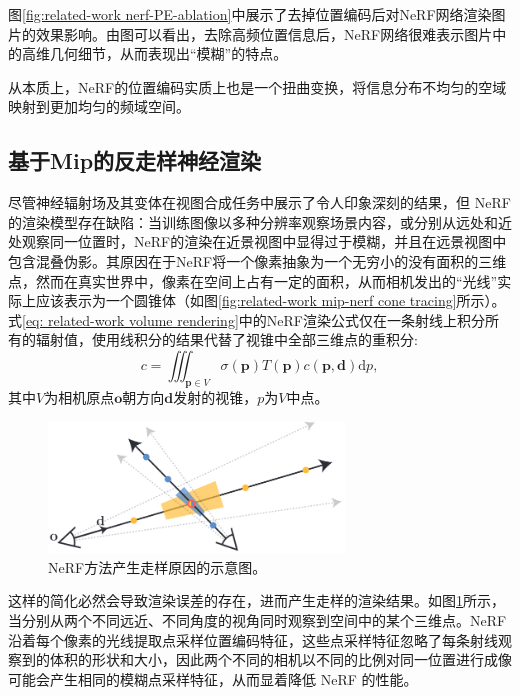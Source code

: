 图\ref{fig:related-work nerf-PE-ablation}中展示了去掉位置编码后对NeRF网络渲染图片的效果影响。由图可以看出，去除高频位置信息后，NeRF网络很难表示图片中的高维几何细节，从而表现出“模糊”的特点。

从本质上，NeRF的位置编码实质上也是一个扭曲变换，将信息分布不均匀的空域映射到更加均匀的频域空间。

\subsection{基于Mip的反走样神经渲染}
尽管神经辐射场\cite{mildenhall_nerf_2020}及其变体\cite{muller_instant_2022,martin-brualla_nerf_2021,zhang_nerf_2020}在视图合成任务中展示了令人印象深刻的结果，但 NeRF 的渲染模型存在缺陷：当训练图像以多种分辨率观察场景内容，或分别从远处和近处观察同一位置时，NeRF的渲染在近景视图中显得过于模糊，并且在远景视图中包含混叠伪影。其原因在于NeRF将一个像素抽象为一个无穷小的没有面积的三维点，然而在真实世界中，像素在空间上占有一定的面积，从而相机发出的“光线”实际上应该表示为一个圆锥体（如图\ref{fig:related-work mip-nerf cone tracing}所示）。式\ref{eq: related-work volume rendering}中的NeRF渲染公式仅在一条射线上积分所有的辐射值，使用线积分的结果代替了视锥中全部三维点的重积分:
\begin{equation}
    c = \iiint_{\mathbf{p}\in V}\sigma(\mathbf{p})T(\mathbf{p})c(\mathbf{p},\mathbf{d})\text{d}p,
\end{equation}
其中$V$为相机原点$\mathbf{o}$朝方向$\mathbf{d}$发射的视锥，$p$为$V$中点。

\begin{figure}[ht]
    \centering
    \includegraphics[width=0.7\textwidth]{undergraduate-thesis/images/related-work/mipnerf-intersection.png}
    \caption{NeRF方法产生走样原因的示意图\cite{barron_mip-nerf_2021}。}
    \label{fig:related-work mip-nerf intersection}
\end{figure}

这样的简化必然会导致渲染误差的存在，进而产生走样的渲染结果。如图\ref{fig:related-work mip-nerf intersection}所示，当分别从两个不同远近、不同角度的视角同时观察到空间中的某个三维点。NeRF沿着每个像素的光线提取点采样位置编码特征，这些点采样特征忽略了每条射线观察到的体积的形状和大小，因此两个不同的相机以不同的比例对同一位置进行成像可能会产生相同的模糊点采样特征，从而显着降低 NeRF 的性能。

